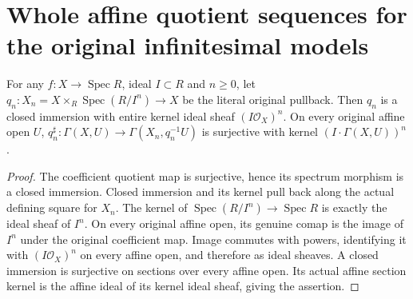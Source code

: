 \section{Whole affine quotient sequences for the original infinitesimal models}

\begin{lemma}
\label{lem:fibre-infinitesimal-projection-kernel}
\leanok
For any $f:X\to\operatorname{Spec}R$, ideal $I\subset R$ and $n\ge0$,
let $q_n:X_n=X\times_R\operatorname{Spec}(R/I^n)\to X$ be the literal
original pullback. Then $q_n$ is a closed immersion with entire kernel
ideal sheaf $(I\mathcal O_X)^n$. On every original affine open $U$,
$q_n^\sharp:\Gamma(X,U)\to\Gamma(X_n,q_n^{-1}U)$ is surjective with
kernel $(I\cdot\Gamma(X,U))^n$.
\end{lemma}
\begin{proof}
The coefficient quotient map is surjective, hence its spectrum morphism
is a closed immersion. Closed immersion and its kernel pull back along
the actual defining square for $X_n$. The kernel of
$\operatorname{Spec}(R/I^n)\to\operatorname{Spec}R$ is exactly the ideal
sheaf of $I^n$. On every original affine open, its genuine comap is the
image of $I^n$ under the original coefficient map. Image commutes with
powers, identifying it with $(I\mathcal O_X)^n$ on every affine open,
and therefore as ideal sheaves. A closed immersion is surjective on
sections over every affine open. Its actual affine section kernel is
the affine ideal of its kernel ideal sheaf, giving the assertion.
\end{proof}

